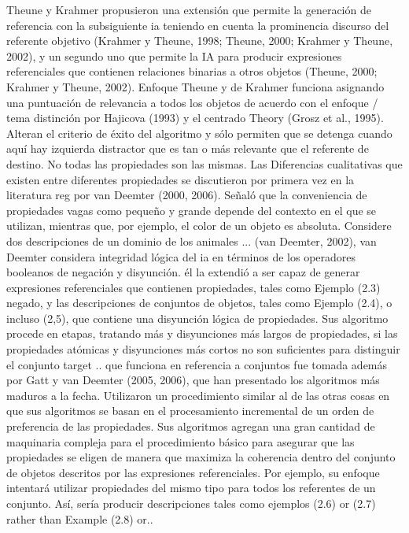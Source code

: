 Theune y Krahmer propusieron una extensi\'on que permite la generaci\'on de referencia con la subsiguiente ia teniendo en cuenta la prominencia discurso del referente objetivo (Krahmer y Theune, 1998; Theune, 2000; Krahmer y Theune, 2002), y un segundo uno que permite la IA para producir expresiones referenciales que
contienen relaciones binarias a otros objetos (Theune, 2000; Krahmer y Theune, 2002). Enfoque Theune y de Krahmer funciona asignando una puntuaci\'on de relevancia a todos los objetos de acuerdo con el enfoque / tema distinci\'on por Hajicova (1993) y el centrado Theory (Grosz et al., 1995). Alteran el criterio de \'exito del algoritmo y s\'olo permiten que se detenga cuando aqu\'i hay izquierda distractor que es tan o m\'as relevante que el referente de destino.
No todas las propiedades son las mismas. Las Diferencias cualitativas que existen entre diferentes propiedades se discutieron por primera vez en la literatura reg por van Deemter (2000, 2006). Se\~nal\'o que la conveniencia de
propiedades vagas como peque\~no y grande depende del contexto en el que se utilizan, mientras que,
por ejemplo, el color de un objeto es absoluta. Considere dos descripciones de un dominio de los animales ... (van Deemter, 2002), van Deemter considera integridad l\'ogica del ia en t\'erminos de los operadores booleanos de negaci\'on y disyunci\'on. \'el la extendi\'o a
ser capaz de generar expresiones referenciales que contienen propiedades, tales como Ejemplo (2.3) negado, y las descripciones de conjuntos de objetos, tales como Ejemplo (2.4), o incluso (2,5), que contiene una disyunci\'on l\'ogica de propiedades. Sus algoritmo procede
en etapas, tratando m\'as y disyunciones m\'as largos de propiedades, si las propiedades at\'omicas
y disyunciones m\'as cortos no son suficientes para distinguir el conjunto target .. que funciona en referencia a conjuntos fue tomada adem\'as por Gatt y van Deemter (2005, 2006), que han presentado los algoritmos m\'as maduros a la fecha. Utilizaron un procedimiento similar al de las otras cosas en que sus algoritmos se basan en el procesamiento incremental de un orden de preferencia de las propiedades. Sus algoritmos agregan una gran cantidad de maquinaria compleja para el procedimiento b\'asico para asegurar que las propiedades
se eligen de manera que maximiza la coherencia dentro del conjunto de objetos descritos por las expresiones referenciales. Por ejemplo, su enfoque intentar\'a utilizar propiedades del mismo tipo para todos los referentes de un conjunto. As\'i, ser\'ia producir
descripciones tales como ejemplos
(2.6) or (2.7) rather than Example (2.8) or.. 


